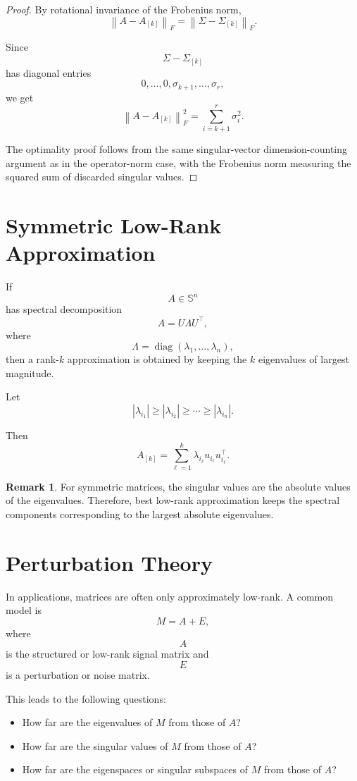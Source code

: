 \documentclass[12pt,oneside]{book}
\numberwithin{equation}{section}
\theoremstyle{definition}
\newtheorem{remark}{Remark}[section]
\theoremstyle{plain}
\theoremstyle{remark}
\newcommand{\norm}[1]{\left\lVert #1 \right\rVert}
\newcommand{\diag}{\operatorname{diag}}
\begin{document}
\begin{proof}
By rotational invariance of the Frobenius norm,
\[
\norm{A-A_{[k]}}_F
=
\norm{\Sigma-\Sigma_{[k]}}_F.
\]

Since
\[
\Sigma-\Sigma_{[k]}
\]
has diagonal entries
\[
0,\dots,0,\sigma_{k+1},\dots,\sigma_r,
\]
we get
\[
\norm{A-A_{[k]}}_F^2
=
\sum_{i=k+1}^r \sigma_i^2.
\]

The optimality proof follows from the same singular-vector dimension-counting argument as in the operator-norm case, with the Frobenius norm measuring the squared sum of discarded singular values.
\end{proof}

\section{Symmetric Low-Rank Approximation}

If
\[
A\in\mathbb{S}^n
\]
has spectral decomposition
\[
A=U\Lambda U^\top,
\]
where
\[
\Lambda=\diag(\lambda_1,\dots,\lambda_n),
\]
then a rank-$k$ approximation is obtained by keeping the $k$ eigenvalues of largest magnitude.

Let
\[
|\lambda_{i_1}|\geq |\lambda_{i_2}|\geq \cdots \geq |\lambda_{i_n}|.
\]

Then
\[
A_{[k]}
=
\sum_{\ell=1}^k
\lambda_{i_\ell}u_{i_\ell}u_{i_\ell}^\top.
\]

\begin{remark}
For symmetric matrices, the singular values are the absolute values of the eigenvalues. Therefore, best low-rank approximation keeps the spectral components corresponding to the largest absolute eigenvalues.
\end{remark}

\section{Perturbation Theory}

In applications, matrices are often only approximately low-rank. A common model is
\[
M=A+E,
\]
where
\[
A
\]
is the structured or low-rank signal matrix and
\[
E
\]
is a perturbation or noise matrix.

This leads to the following questions:
\begin{itemize}
\item How far are the eigenvalues of $M$ from those of $A$?
\item How far are the singular values of $M$ from those of $A$?
\item How far are the eigenspaces or singular subspaces of $M$ from those of $A$?
\end{itemize}
\end{document}
